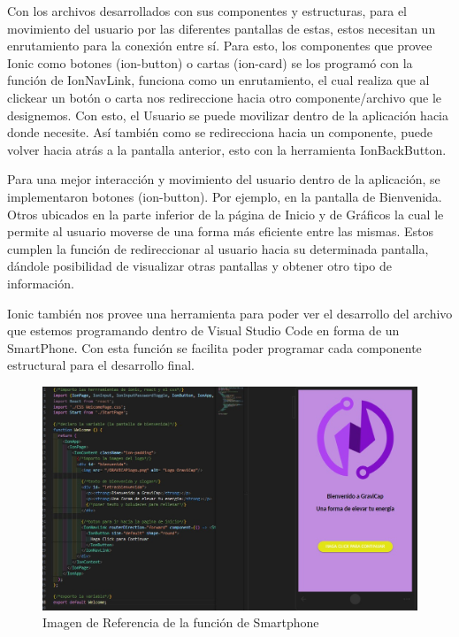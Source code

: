                             Con los archivos desarrollados con sus componentes y estructuras, para el movimiento del usuario por las diferentes pantallas de estas, estos necesitan un enrutamiento para la conexión entre sí. Para esto, los componentes que provee Ionic como botones (ion-button) o cartas (ion-card) se los programó con la función de IonNavLink, funciona como un enrutamiento, el cual realiza que al clickear un botón o carta nos redireccione hacia otro componente/archivo que le designemos. Con esto, el Usuario se puede movilizar dentro de la aplicación hacia donde necesite. Así también como se redirecciona hacia un componente, puede volver hacia atrás a la pantalla anterior, esto con la herramienta IonBackButton.\par
                            Para una mejor interacción y movimiento del usuario dentro de la aplicación, se implementaron botones (ion-button). Por ejemplo, en la pantalla de Bienvenida. Otros ubicados en la parte inferior de la página de Inicio y de Gráficos la cual le permite al usuario moverse de una forma más eficiente entre las mismas. Estos cumplen la función de redireccionar al usuario hacia su determinada pantalla, dándole posibilidad de visualizar otras pantallas y obtener otro tipo de información.\par
                            Ionic también nos provee una herramienta para poder ver el desarrollo del archivo que estemos programando dentro de Visual Studio Code en forma de un SmartPhone. Con esta función se facilita poder programar cada componente estructural para el desarrollo final.\par
                            
                            \begin{figure}[H]
                                \centering
                                \includegraphics[width=\linewidth]{Aplicación/Code.png}
                                \caption{Imagen de Referencia de la función de Smartphone}
                                \label{fig:a15}
                            \end{figure}
                
